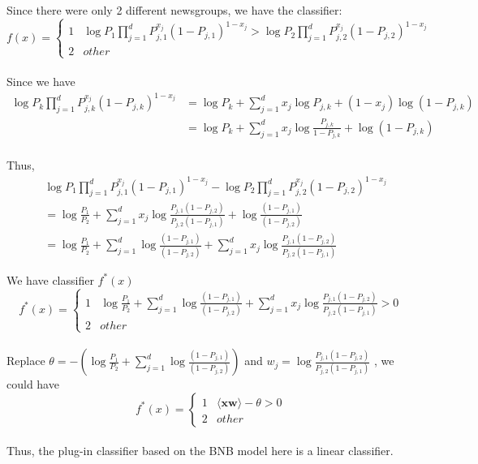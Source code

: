 \documentclass[twoside,11pt]{homework}
\begin{document}
Since there were only 2 different newsgroups, we have the classifier:
\[
f(x) =
\begin{cases} 
1 & \log{P_1 \prod_{j=1}^dP_{j,1}^{x_{j}}(1-P_{j,1})^{1-x_{j}}}  >  \log{P_2 \prod_{j=1}^dP_{j,2}^{x_{j}}(1-P_{j,2})^{1-x_{j}}} \\
2 & other
\end{cases}
\] \\

Since we have
\begin{align*}
\log{P_k \prod_{j=1}^dP_{j,k}^{x_{j}}(1-P_{j,k})^{1-x_{j}}} &= \log{P_k} + \sum_{j=1}^d x_{j} \log{P_{j,k}} + (1-x_{j})\log{(1-P_{j,k})}\\
&= \log{P_k} + \sum_{j=1}^d x_{j} \log{\frac{P_{j,k}}{1-P_{j,k}}} + \log{(1-P_{j,k})}\\
\end{align*}

Thus, 
\begin{align*}
&\log{P_1 \prod_{j=1}^dP_{j,1}^{x_{j}}(1-P_{j,1})^{1-x_{j}}}  -  \log{P_2 \prod_{j=1}^dP_{j,2}^{x_{j}}(1-P_{j,2})^{1-x_{j}}} \\
&= \log{\frac{P_{1}}{P_{2}}} + \sum_{j=1}^d x_{j} \log{\frac{P_{j,1}(1-P_{j,2})}{P_{j,2}(1-P_{j,1})}} + \log\frac{(1-P_{j,1})}{(1-P_{j,2})} \\
&= \log{\frac{P_{1}}{P_{2}}}  + \sum_{j=1}^d\log\frac{(1-P_{j,1})}{(1-P_{j,2})} + \sum_{j=1}^d x_{j} \log{\frac{P_{j,1}(1-P_{j,2})}{P_{j,2}(1-P_{j,1})}}
\end{align*}

We have classifier $f^*(x)$
\[
f^*(x) =
\begin{cases} 
1 &  \log{\frac{P_{1}}{P_{2}}}  + \sum_{j=1}^d\log\frac{(1-P_{j,1})}{(1-P_{j,2})} + \sum_{j=1}^d x_{j} \log{\frac{P_{j,1}(1-P_{j,2})}{P_{j,2}(1-P_{j,1})}} > 0\\
2 & other
\end{cases}
\] \\

Replace $\theta = - (\log{\frac{P_{1}}{P_{2}}}  + \sum_{j=1}^d\log\frac{(1-P_{j,1})}{(1-P_{j,2})})$ and $w_j = \log{\frac{P_{j,1}(1-P_{j,2})}{P_{j,2}(1-P_{j,1})}}$
, we could have 
\[
f^*(x) = 
\begin{cases} 
1 &\langle \pmb x \pmb w \rangle - \theta > 0 \\
2 & other
\end{cases}
\] \\

Thus, the plug-in classifier based on the BNB model here is a linear classifier.\\
\end{document}
